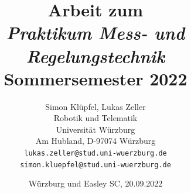 \documentclass[11pt,a4paper]{article}
\begin{document}
\title{\Large\bf Arbeit zum \\ \textit{Praktikum Mess- und Regelungstechnik} \\ Sommersemester 2022}
\author{Simon Klüpfel, Lukas Zeller \\
  Robotik und Telematik \\
  Universität Würzburg\\
  Am Hubland, D-97074 Würzburg\\
\small \texttt{lukas.zeller@stud.uni-wuerzburg.de} \\
\small \texttt{simon.kluepfel@stud.uni-wuerzburg.de}}
\date{Würzburg und Easley SC, 20.09.2022}

\maketitle
\end{document}

